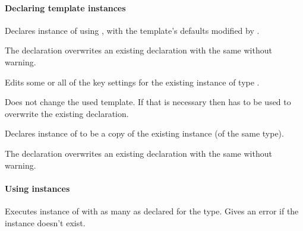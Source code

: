 \documentclass{l3in2edoc}
\let\subsubsubsection\paragraph
\begin{document}
\subsubsubsection{Declaring template instances}


\begin{function}[user]
  {
    \DeclareInstance
  }
  \begin{syntax}
        
  \end{syntax}
  Declares instance  of  using ,
  with the template's defaults modified by .

  The declaration overwrites an existing declaration with the same
   without warning.
\end{function}



\begin{function}[user]
  {
    \EditInstance
  }
  \begin{syntax}
       
  \end{syntax}
  Edits some or all of the key settings for the existing instance
   of type .

  Does not change the used template. If that is necessary then
   has to be used to overwrite the existing
  declaration.
\end{function}




\begin{function}[user]
  {
    \DeclareInstanceCopy
  }
  \begin{syntax}
       
  \end{syntax}
  Declares instance  of  to be a copy of the
  existing instance  (of the same type).

  The declaration overwrites an existing declaration with the same
   without warning.
\end{function}





\subsubsubsection{Using instances}



\begin{function}[user]
  {
    \UseInstance
  }
  \begin{syntax}
       
  \end{syntax}
  Executes instance  of  with as many
   as declared for the type. Gives an error if the
  instance doesn't exist.
\end{function}
\end{document}
